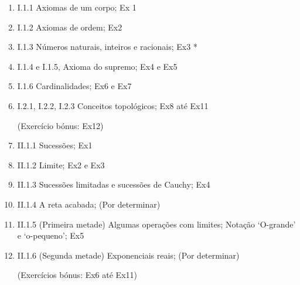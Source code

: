 \documentclass{article}
\begin{document}
	\begin{enumerate}
	\item I.1.1 Axiomas de um corpo; Ex 1
	
	\item I.1.2 Axiomas de ordem; Ex2
	
	\item I.1.3 Números naturais, inteiros e racionais; Ex3 *
	
	\item I.1.4 e I.1.5, Axioma do supremo; Ex4 e Ex5
	
	\item I.1.6 Cardinalidades; Ex6 e Ex7
	
	\item I.2.1, I.2.2, I.2.3 Conceitos topológicos; Ex8 até Ex11
	
	(Exercício bónus: Ex12)
	
	\item II.1.1 Sucessões; Ex1
	
	\item II.1.2 Limite; Ex2 e Ex3
	
	\item II.1.3 Sucessões limitadas e sucessões de Cauchy; Ex4
	
	\item II.1.4 A reta acabada; (Por determinar)
	
	\item II.1.5 (Primeira metade) Algumas operações com limites; Notação `O-grande' e `o-pequeno'; Ex5
	
	\item II.1.6 (Segunda metade) Exponenciais reais; (Por determinar)
	
	(Exercícios bónus: Ex6 até Ex11)
	\end{enumerate}
\end{document}
